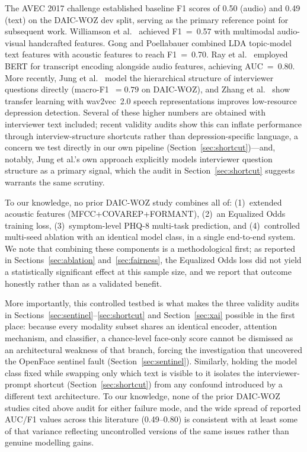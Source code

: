 \documentclass[5p,twocolumn]{elsarticle}
\begin{document}
The AVEC 2017 challenge \cite{ringeval2017} established baseline F1
scores of 0.50 (audio) and 0.49 (text) on the DAIC-WOZ dev split,
serving as the primary reference point for subsequent work.
Williamson et al.\ \cite{williamson2016} achieved F1~=~0.57 with
multimodal audio-visual handcrafted features. Gong and Poellabauer
\cite{gong2017} combined LDA topic-model text features with acoustic
features to reach F1~=~0.70. Ray et al.\ \cite{ray2019} employed
BERT for transcript encoding alongside audio features, achieving
AUC~=~0.80. More recently, Jung et al.\ \cite{jung2024hique} model
the hierarchical structure of interviewer questions directly
(macro-F1~$=0.79$ on DAIC-WOZ), and Zhang et al.\
\cite{zhang2024wav2vec} show transfer learning with wav2vec~2.0
speech representations improves low-resource depression detection.
Several
of these higher numbers are obtained with interviewer text included;
recent validity audits \cite{burdisso2024therapist,patapati2025invalid}
show this can inflate performance through interview-structure
shortcuts rather than depression-specific language, a concern we
test directly in our own pipeline (Section~\ref{sec:shortcut})---and,
notably, Jung et al.'s own approach explicitly models interviewer
question structure as a primary signal, which the audit in
Section~\ref{sec:shortcut} suggests warrants the same scrutiny.

To our knowledge, no prior DAIC-WOZ study combines all of: (1)~extended
acoustic features (MFCC+COVAREP+FORMANT), (2)~an Equalized Odds
training loss, (3)~symptom-level PHQ-8 multi-task prediction, and
(4)~controlled multi-seed ablation with an identical model class, in a
single end-to-end system. We note that combining these components is
a methodological first; as reported in Sections~\ref{sec:ablation}
and~\ref{sec:fairness}, the Equalized Odds loss did not yield a
statistically significant effect at this sample size, and we report
that outcome honestly rather than as a validated benefit.

More importantly, this controlled testbed is what makes the three
validity audits in Sections~\ref{sec:sentinel}--\ref{sec:shortcut} and
Section~\ref{sec:xai} possible in the first place: because every
modality subset shares an identical encoder, attention mechanism, and
classifier, a chance-level face-only score cannot be dismissed as an
architectural weakness of that branch, forcing the investigation that
uncovered the OpenFace sentinel fault
(Section~\ref{sec:sentinel}). Similarly, holding the model class fixed
while swapping only which text is visible to it isolates the
interviewer-prompt shortcut (Section~\ref{sec:shortcut}) from any
confound introduced by a different text architecture. To our
knowledge, none of the prior DAIC-WOZ studies cited above audit for
either failure mode, and the wide spread of reported AUC/F1 values
across this literature (0.49--0.80) is consistent with at least some
of that variance reflecting uncontrolled versions of the same issues
rather than genuine modelling gains.
\end{document}
